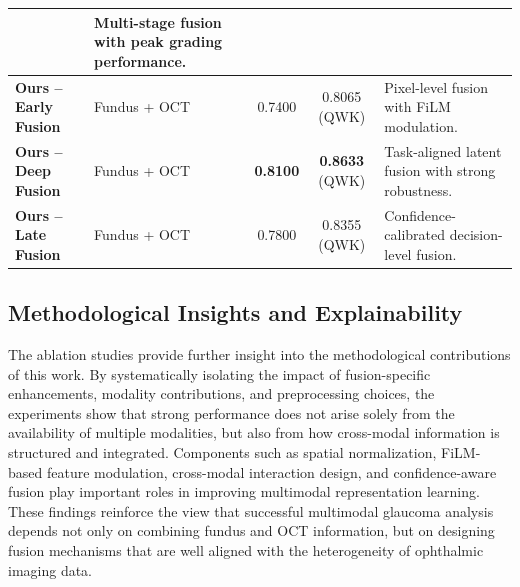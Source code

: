 \documentclass[preprint,12pt]{elsarticle}
\begin{document}
\begin{table}[!t]
{\begin{tabular}{|p{}|p{}|c|c|p{}|}
                            & Multi-stage fusion with peak grading performance.                                                                  \\
            \hline\hline
            \textbf{Ours -- Early Fusion}
                            & Fundus + OCT                                       & 0.7400            & 0.8065 (QWK)
                            & Pixel-level fusion with FiLM modulation.                                                                           \\
            \hline
            \textbf{Ours -- Deep Fusion}
                            & Fundus + OCT                                       & \textbf{0.8100}   & \textbf{0.8633} (QWK)
                            & Task-aligned latent fusion with strong robustness.                                                                 \\
            \hline
            \textbf{Ours -- Late Fusion}
                            & Fundus + OCT                                       & 0.7800            & 0.8355 (QWK)
                            & Confidence-calibrated decision-level fusion.                                                                       \\
            \hline
        \end{tabular}}
\end{table}


\subsection{Methodological Insights and Explainability}

The ablation studies provide further insight into the methodological contributions of this work. By systematically isolating the impact of fusion-specific enhancements, modality contributions, and preprocessing choices, the experiments show that strong performance does not arise solely from the availability of multiple modalities, but also from how cross-modal information is structured and integrated. Components such as spatial normalization, FiLM-based feature modulation, cross-modal interaction design, and confidence-aware fusion play important roles in improving multimodal representation learning. These findings reinforce the view that successful multimodal glaucoma analysis depends not only on combining fundus and OCT information, but on designing fusion mechanisms that are well aligned with the heterogeneity of ophthalmic imaging data.
\end{document}
